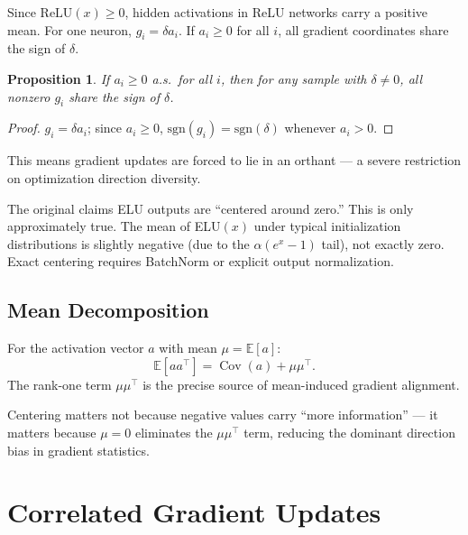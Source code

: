 \documentclass[12pt,a4paper]{article}
\newtheorem{proposition}{Proposition}[section]
\theoremstyle{definition}
\theoremstyle{remark}
\newcommand{\E}{\mathbb{E}}
\newcommand{\Cov}{\operatorname{Cov}}
\begin{document}
Since $\mathrm{ReLU}(x) \ge 0$, hidden activations in ReLU networks carry a positive mean. For one neuron, $g_i = \delta a_i$. If $a_i \ge 0$ for all $i$, all gradient coordinates share the sign of $\delta$.

\begin{proposition}
If $a_i \ge 0$ a.s.\ for all $i$, then for any sample with $\delta \ne 0$, all nonzero $g_i$ share the sign of $\delta$.
\end{proposition}
\begin{proof}
$g_i = \delta a_i$; since $a_i \ge 0$, $\mathrm{sgn}(g_i) = \mathrm{sgn}(\delta)$ whenever $a_i>0$.
\end{proof}

This means gradient updates are forced to lie in an orthant — a severe restriction on optimization direction diversity.

\begin{critbox}
The original claims ELU outputs are ``centered around zero.'' This is only approximately true. The mean of ELU$(x)$ under typical initialization distributions is slightly negative (due to the $\alpha(e^x-1)$ tail), not exactly zero. Exact centering requires BatchNorm or explicit output normalization.
\end{critbox}

\subsection{Mean Decomposition}

For the activation vector $a$ with mean $\mu = \E[a]$:
\[
\E[a a^\top] = \Cov(a) + \mu\mu^\top.
\]
The rank-one term $\mu\mu^\top$ is the precise source of mean-induced gradient alignment.

\begin{keybox}
Centering matters not because negative values carry ``more information'' — it matters because $\mu = 0$ eliminates the $\mu\mu^\top$ term, reducing the dominant direction bias in gradient statistics.
\end{keybox}

\section{Correlated Gradient Updates}
\label{sec:corr}
\end{document}
